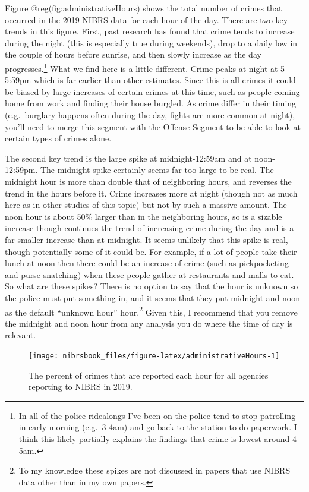 \documentclass[
  12pt,
  openany]{book}
\begin{document}
Figure @reg(fig:administrativeHours) shows the total number of crimes that occurred in the 2019 NIBRS data for each hour of the day. There are two key trends in this figure. First, past research has found that crime tends to increase during the night (this is especially true during weekends), drop to a daily low in the couple of hours before sunrise, and then slowly increase as the day progresses.\footnote{In all of the police ridealongs I've been on the police tend to stop patrolling in early morning (e.g.~3-4am) and go back to the station to do paperwork. I think this likely partially explains the findings that crime is lowest around 4-5am.} What we find here is a little different. Crime peaks at night at 5-5:59pm which is far earlier than other estimates. Since this is all crimes it could be biased by large increases of certain crimes at this time, such as people coming home from work and finding their house burgled. As crime differ in their timing (e.g.~burglary happens often during the day, fights are more common at night), you'll need to merge this segment with the Offense Segment to be able to look at certain types of crimes alone.

The second key trend is the large spike at midnight-12:59am and at noon-12:59pm. The midnight spike certainly seems far too large to be real. The midnight hour is more than double that of neighboring hours, and reverses the trend in the hours before it. Crime increases more at night (though not as much here as in other studies of this topic) but not by such a massive amount. The noon hour is about 50\% larger than in the neighboring hours, so is a sizable increase though continues the trend of increasing crime during the day and is a far smaller increase than at midnight. It seems unlikely that this spike is real, though potentially some of it could be. For example, if a lot of people take their lunch at noon then there could be an increase of crime (such as pickpocketing and purse snatching) when these people gather at restaurants and malls to eat. So what are these spikes? There is no option to say that the hour is unknown so the police must put something in, and it seems that they put midnight and noon as the default ``unknown hour'' hour.\footnote{To my knowledge these spikes are not discussed in papers that use NIBRS data other than in my own papers.} Given this, I recommend that you remove the midnight and noon hour from any analysis you do where the time of day is relevant.

\begin{figure}

{\centering \texttt{[image: nibrsbook\_files/figure-latex/administrativeHours-1]} 

}

\caption{The percent of crimes that are reported each hour for all agencies reporting to NIBRS in 2019.}\label{fig:administrativeHours}
\end{figure}
\end{document}
